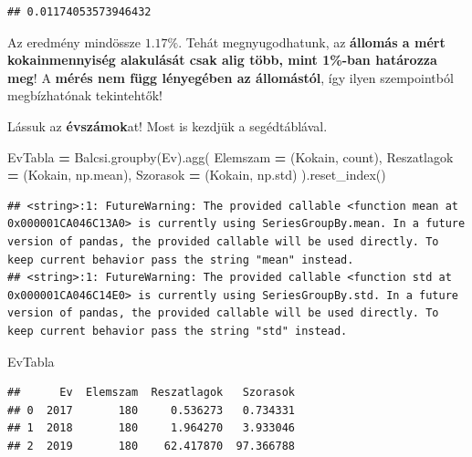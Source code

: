 \documentclass[
]{book}
\newenvironment{Shaded}{\begin{snugshade}}{\end{snugshade}}
\newcommand{\NormalTok}[1]{#1}
\newcommand{\OperatorTok}[1]{\textcolor[rgb]{0.81,0.36,0.00}{\textbf{#1}}}
\newcommand{\StringTok}[1]{\textcolor[rgb]{0.31,0.60,0.02}{#1}}
\begin{document}
\begin{verbatim}
## 0.01174053573946432
\end{verbatim}

Az eredmény mindössze \(1.17\%\). Tehát megnyugodhatunk, az \textbf{állomás a mért kokainmennyiség alakulását csak alig több, mint 1\%-ban határozza meg}! A \textbf{mérés nem függ lényegében az állomástól}, így ilyen szempointból megbízhatónak tekintehtők!

Lássuk az \textbf{évszámok}at! Most is kezdjük a segédtáblával.

\begin{Shaded}
\begin{Highlighting}[]
\NormalTok{EvTabla }\OperatorTok{=}\NormalTok{ Balcsi.groupby(}\StringTok{\textquotesingle{}Ev\textquotesingle{}}\NormalTok{).agg(}
\NormalTok{  Elemszam }\OperatorTok{=}\NormalTok{ (}\StringTok{\textquotesingle{}Kokain\textquotesingle{}}\NormalTok{, }\StringTok{\textquotesingle{}count\textquotesingle{}}\NormalTok{),}
\NormalTok{  Reszatlagok }\OperatorTok{=}\NormalTok{ (}\StringTok{\textquotesingle{}Kokain\textquotesingle{}}\NormalTok{, np.mean),}
\NormalTok{  Szorasok }\OperatorTok{=}\NormalTok{ (}\StringTok{\textquotesingle{}Kokain\textquotesingle{}}\NormalTok{, np.std)}
\NormalTok{).reset\_index()}
\end{Highlighting}
\end{Shaded}

\begin{verbatim}
## <string>:1: FutureWarning: The provided callable <function mean at 0x000001CA046C13A0> is currently using SeriesGroupBy.mean. In a future version of pandas, the provided callable will be used directly. To keep current behavior pass the string "mean" instead.
## <string>:1: FutureWarning: The provided callable <function std at 0x000001CA046C14E0> is currently using SeriesGroupBy.std. In a future version of pandas, the provided callable will be used directly. To keep current behavior pass the string "std" instead.
\end{verbatim}

\begin{Shaded}
\begin{Highlighting}[]
\NormalTok{EvTabla}
\end{Highlighting}
\end{Shaded}

\begin{verbatim}
##      Ev  Elemszam  Reszatlagok   Szorasok
## 0  2017       180     0.536273   0.734331
## 1  2018       180     1.964270   3.933046
## 2  2019       180    62.417870  97.366788
\end{verbatim}
\end{document}
